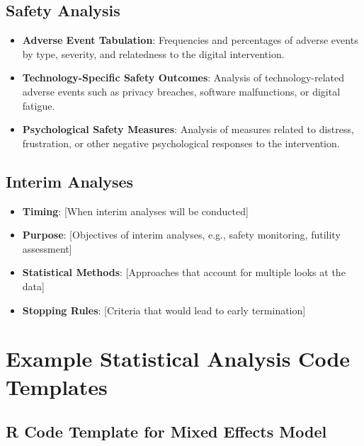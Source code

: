 \subsection{Safety Analysis}

\begin{itemize}
    \item \textbf{Adverse Event Tabulation}: Frequencies and percentages of adverse events by type, severity, and relatedness to the digital intervention.
    
    \item \textbf{Technology-Specific Safety Outcomes}: Analysis of technology-related adverse events such as privacy breaches, software malfunctions, or digital fatigue.
    
    \item \textbf{Psychological Safety Measures}: Analysis of measures related to distress, frustration, or other negative psychological responses to the intervention.
\end{itemize}

\subsection{Interim Analyses}

\begin{itemize}
    \item \textbf{Timing}: [When interim analyses will be conducted]
    
    \item \textbf{Purpose}: [Objectives of interim analyses, e.g., safety monitoring, futility assessment]
    
    \item \textbf{Statistical Methods}: [Approaches that account for multiple looks at the data]
    
    \item \textbf{Stopping Rules}: [Criteria that would lead to early termination]
\end{itemize}

\section{Example Statistical Analysis Code Templates}

\subsection{R Code Template for Mixed Effects Model}

